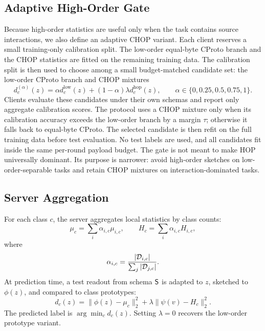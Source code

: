 \subsection{Adaptive High-Order Gate}

Because high-order statistics are useful only when the task contains source interactions, we also define an adaptive CHOP variant. Each client reserves a small training-only calibration split. The low-order equal-byte CProto branch and the CHOP statistics are fitted on the remaining training data. The calibration split is then used to choose among a small budget-matched candidate set: the low-order CProto branch and CHOP mixtures
\begin{equation}
    d_c^{(\alpha)}(z)=
    \alpha d^{\mathrm{low}}_c(z)
    +(1-\alpha)\lambda d^{\mathrm{hop}}_c(z),
    \qquad
    \alpha\in\{0,0.25,0.5,0.75,1\}.
\end{equation}
Clients evaluate these candidates under their own schemas and report only aggregate calibration scores. The protocol uses a CHOP mixture only when its calibration accuracy exceeds the low-order branch by a margin \(\tau\); otherwise it falls back to equal-byte CProto. The selected candidate is then refit on the full training data before test evaluation. No test labels are used, and all candidates fit inside the same per-round payload budget. The gate is not meant to make HOP universally dominant. Its purpose is narrower: avoid high-order sketches on low-order-separable tasks and retain CHOP mixtures on interaction-dominated tasks.

\subsection{Server Aggregation}

For each class \(c\), the server aggregates local statistics by class counts:
\begin{equation}
    \mu_c = \sum_i \alpha_{i,c}\mu_{i,c},\qquad
    H_c = \sum_i \alpha_{i,c}H_{i,c},
\end{equation}
where
\begin{equation}
    \alpha_{i,c}=
    \frac{|\mathcal{D}_{i,c}|}{\sum_j |\mathcal{D}_{j,c}|}.
\end{equation}
At prediction time, a test readout from schema \(\mathsf{S}\) is adapted to \(z\), sketched to \(\phi(z)\), and compared to class prototypes:
\begin{equation}
    d_c(z)=
    \|\phi(z)-\mu_c\|_2^2
    + \lambda \|\psi(v)-H_c\|_2^2.
\end{equation}
The predicted label is \(\arg\min_c d_c(z)\). Setting \(\lambda=0\) recovers the low-order prototype variant.

